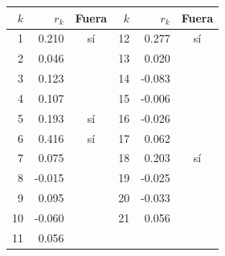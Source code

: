 \begin{tabular}{rrc|rrc}
\toprule
$k$ & $r_k$ & Fuera & $k$  & $r_k$  & Fuera  \\
\midrule
1 & 0.210 & sí & 12 & 0.277 & sí \\
2 & 0.046 &  & 13 & 0.020 &  \\
3 & 0.123 &  & 14 & -0.083 &  \\
4 & 0.107 &  & 15 & -0.006 &  \\
5 & 0.193 & sí & 16 & -0.026 &  \\
6 & 0.416 & sí & 17 & 0.062 &  \\
7 & 0.075 &  & 18 & 0.203 & sí \\
8 & -0.015 &  & 19 & -0.025 &  \\
9 & 0.095 &  & 20 & -0.033 &  \\
10 & -0.060 &  & 21 & 0.056 &  \\
11 & 0.056 &  &  &  &  \\
\bottomrule
\end{tabular}

